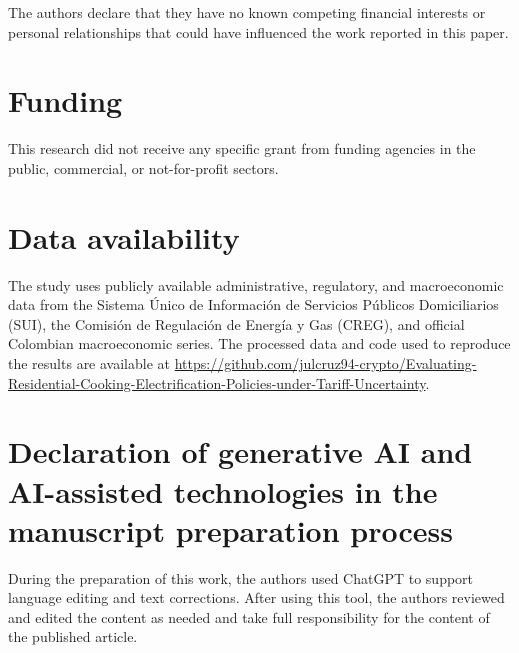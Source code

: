 \documentclass[authoryear,preprint,review,10pt]{elsarticle}
\begin{document}
The authors declare that they have no known competing financial interests
or personal relationships that could have influenced the work reported
in this paper.

\section*{Funding}

This research did not receive any specific grant from funding agencies
in the public, commercial, or not-for-profit sectors.

\section*{Data availability}

The study uses publicly available administrative, regulatory, and
macroeconomic data from the Sistema Único de Información de Servicios
Públicos Domiciliarios (SUI), the Comisión de Regulación de Energía y Gas
(CREG), and official Colombian macroeconomic series. The processed data
and code used to reproduce the results are available at
\url{https://github.com/julcruz94-crypto/Evaluating-Residential-Cooking-Electrification-Policies-under-Tariff-Uncertainty}.


\section*{Declaration of generative AI and AI-assisted technologies in the manuscript preparation process}

During the preparation of this work, the authors used ChatGPT to support language editing and text corrections. After using this tool, the authors reviewed and edited the content as needed and take full responsibility for the content of the published article.

\appendix
{}
\renewcommand{\theequation}{\Alph{section}.\arabic{equation}}
\renewcommand{\thefigure}{\Alph{section}.\arabic{figure}}
\renewcommand{\thetable}{\Alph{section}.\arabic{table}}
\end{document}
